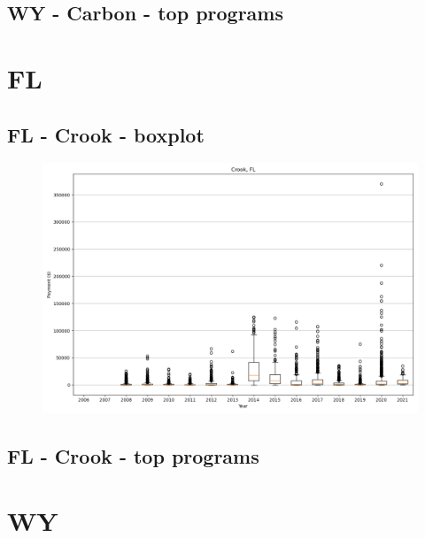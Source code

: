 \subsection*{WY - Carbon - top programs}

\newpage
\section*{FL}
\subsection*{FL - Crook - boxplot}
\begin{figure}[h]
\centering
\includegraphics[width=7in]{../output/boxplots/counties/Crook-FL_boxplot.png}
\end{figure}


\subsection*{FL - Crook - top programs}

\newpage
\section*{WY}
